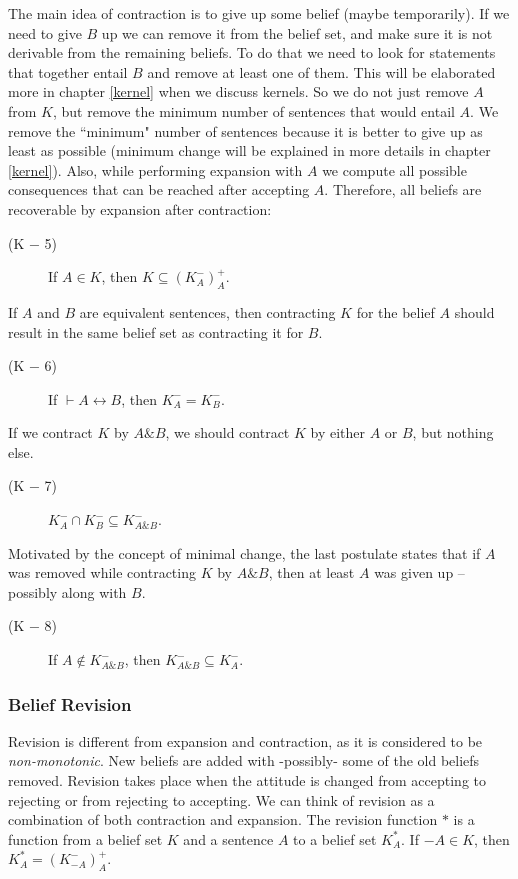 \documentclass{sfuthesis}
\theoremstyle{plain}
\theoremstyle{definition}
\begin{document}
The main idea of contraction is to give up some belief (maybe temporarily). If we need to give $B$ up we can remove it from the belief set, and make sure it is not derivable from the remaining beliefs. To do that we need to look for statements that together entail $B$ and remove at least one of them. This will be elaborated more in chapter \ref{kernel} when we discuss kernels. So we do not just remove $A$ from $K$, but remove the minimum number of sentences that would entail $A$. We remove the ``minimum" number of sentences because it is better to give up as least as possible (minimum change will be explained in more details in chapter \ref{kernel}). Also, while performing expansion with $A$ we compute all possible consequences that can be reached after accepting $A$. Therefore, all beliefs are recoverable by expansion after contraction:
\begin{description}
\item[(K $-$ 5)] If $A \in K$, then $K \subseteq (K^{-}_{A})^{+}_{A}$.
\end{description}
If $A$ and $B$ are equivalent sentences, then contracting $K$ for the belief $A$ should result in the same belief set as contracting it for $B$.
\begin{description}
\item[(K $-$ 6)] If $\vdash A \leftrightarrow B$, then $K^{-}_{A} = K^{-}_{B}$.
\end{description}
If we contract $K$ by $A \& B$, we should contract $K$ by either $A$ or $B$, but nothing else.
\begin{description}
\item[(K $-$ 7)] $K^{-}_{A} \cap K^{-}_{B} \subseteq K^{-}_{A \& B}$.
\end{description}
Motivated by the concept of minimal change, the last postulate states that if $A$ was removed while contracting $K$ by $A \& B$, then at least $A$ was given up -- possibly along with $B$.
\begin{description}
\item[(K $-$ 8)] If $A \notin K^{-}_{A \& B}$, then $K^{-}_{A \& B} \subseteq K^{-}_{A}$.
\end{description}

\subsubsection{Belief Revision}
Revision is different from expansion and contraction, as it is considered to be \textit{non-monotonic}. New beliefs are added with -possibly- some of the old beliefs removed. Revision takes place when the attitude is changed from accepting to rejecting or from rejecting to accepting. We can think of revision as a combination of both contraction and expansion. The revision function $*$ is a function from a belief set $K$ and a sentence $A$ to a belief set $K^{*}_{A}$. If $-A \in K$, then $K^{*}_{A} = (K^{-}_{-A})^{+}_{A}$.
\end{document}
